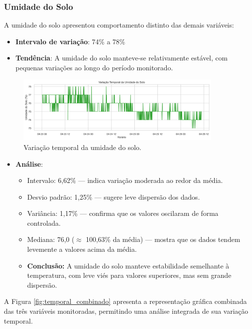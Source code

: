 \documentclass[12pt, a4paper]{article}
\begin{document}
\subsubsection{Umidade do Solo}
A umidade do solo apresentou comportamento distinto das demais variáveis:

\begin{itemize}
    \item \textbf{Intervalo de variação}: 74\% a 78\%
    \item \textbf{Tendência}:
        A umidade do solo manteve-se relativamente estável, com pequenas variações ao longo do período monitorado.
\end{itemize}

\begin{figure}[H]
\centering
\includegraphics[width=0.9\textwidth]{graficos/temporal_usolo.png}
\caption{Variação temporal da umidade do solo.}
\label{fig:temporal_usolo}
\end{figure}

\begin{itemize}
    \item \textbf{Análise}:
        \begin{itemize}
            \item Intervalo: 6{,}62\% — indica variação moderada ao redor da média.
            \item Desvio padrão: 1{,}25\% — sugere leve dispersão dos dados.
            \item Variância: 1{,}17\% — confirma que os valores oscilaram de forma controlada.
            \item Mediana: 76{,}0 ($\approx$ 100{,}63\% da média) — mostra que os dados tendem levemente a valores acima da média.
            \item \textbf{Conclusão:} A umidade do solo manteve estabilidade semelhante à temperatura, com leve viés para valores superiores, mas sem grande dispersão.
        \end{itemize}
\end{itemize}

A Figura \ref{fig:temporal_combinado} apresenta a representação gráfica combinada das três variáveis monitoradas, permitindo uma análise integrada de sua variação temporal.
\end{document}
